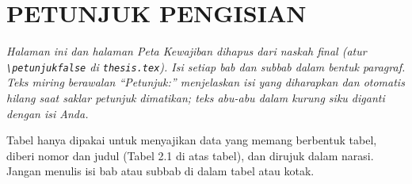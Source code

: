 \chapter*{PETUNJUK PENGISIAN}
\thispagestyle{capstone}
{\itshape Halaman ini dan halaman Peta Kewajiban dihapus dari naskah final (atur \texttt{\textbackslash petunjukfalse} di \texttt{thesis.tex}). Isi setiap bab dan subbab dalam bentuk paragraf. Teks miring berawalan ``Petunjuk:'' menjelaskan isi yang diharapkan dan otomatis hilang saat saklar petunjuk dimatikan; teks abu-abu dalam kurung siku diganti dengan isi Anda.

Tabel hanya dipakai untuk menyajikan data yang memang berbentuk tabel, diberi nomor dan judul (Tabel 2.1 di atas tabel), dan dirujuk dalam narasi. Jangan menulis isi bab atau subbab di dalam tabel atau kotak.\par}

